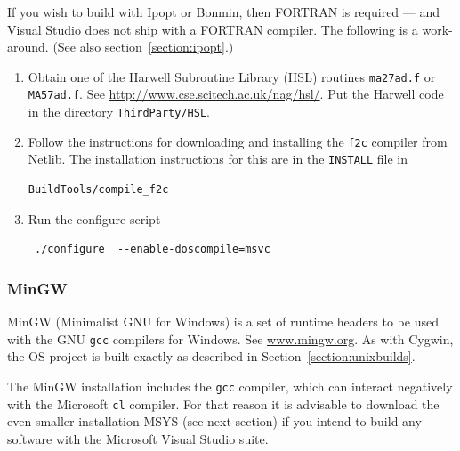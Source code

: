 \documentclass[11pt]{article}
\renewcommand{\_}{{\char"5F}}
\renewcommand{\{}{{\char"7B}}
\renewcommand{\}}{{\char"7D}}
\renewcommand{\^}{{\char"0D}}
\renewcommand{\'}{{\char"0D}}
\begin{document}
\begin{enumerate}[Step 1:]
If you wish to build with Ipopt or Bonmin, then FORTRAN is required --- and Visual Studio does not ship with a FORTRAN compiler. 
The following is a work-around. (See also section~\ref{section:ipopt}.)

\begin{enumerate}[Step a.]

\item{}  Obtain one of the   Harwell Subroutine Library (HSL) routines {\tt ma27ad.f} or {\tt MA57ad.f}.  
See \url{http://www.cse.scitech.ac.uk/nag/hsl/}.  Put the Harwell code in the directory {\tt ThirdParty/HSL}.




\item{}  Follow the instructions for downloading and installing the {\tt f2c} compiler from Netlib.  
The installation instructions for this are in the {\tt INSTALL} file in
\begin{verbatim}
BuildTools/compile_f2c
\end{verbatim}



\item{}  Run the configure script

\begin{verbatim}
 ./configure  --enable-doscompile=msvc
\end{verbatim}


\end{enumerate}


\end{enumerate}



\subsubsection{MinGW} \label{section:mingw}


MinGW (Minimalist GNU for Windows) is a set of runtime headers to be used with the GNU {\tt gcc} compilers for Windows.  
See \url{www.mingw.org}. As with Cygwin, the OS project is  built exactly as described in Section~\ref{section:unixbuilds}.

The MinGW installation includes the {\tt gcc} compiler, which can interact negatively with the Microsoft {\tt cl} compiler.
For that reason it is advisable to download the even smaller installation MSYS (see next section) if you intend to
build any software with the Microsoft Visual Studio suite.
\end{document}
